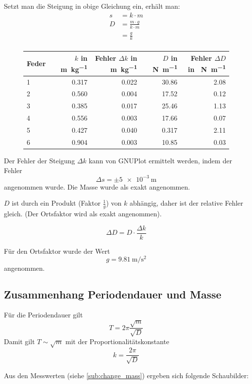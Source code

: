 Setzt man die Steigung in obige Gleichung ein, erhält man:
\begin{align*}
s &= k \cdot m \\
D &= \frac{m \cdot g}{k \cdot m} \\
  &= \frac{g}{k} \\
\end{align*}

\begin{figure}[H]
\centering
\begin{tabular}{lrrrr}
Feder & $k$ in \SI{}{\meter\per\kilo\gram} & Fehler $\Delta k$ in \SI{}{\meter\per\kilo\gram} & $D$ in \SI{}{\newton\per\meter} & Fehler $\Delta D$ in \SI{}{\newton\per\meter} \\ \hline
1 & \num{0.317} & \num{0.022} & \num{30.86} & \num{2.08}\\
2 & \num{0.560} & \num{0.004} & \num{17.52} & \num{0.12}\\
3 & \num{0.385} & \num{0.017} & \num{25.46} & \num{1.13}\\
4 & \num{0.556} & \num{0.003} & \num{17.66} & \num{0.07}\\
5 & \num{0.427} & \num{0.040} & \num{0.317} & \num{2.11}\\
6 & \num{0.904} & \num{0.003} & \num{10.85} & \num{0.03}\\
\end{tabular}
\end{figure}

Der Fehler der Steigung $\Delta k$ kann von GNUPlot ermittelt werden, indem der Fehler
$$\Delta s = \pm \SI{5e-3}{\meter}$$
angenommen wurde. Die Masse wurde als exakt angenommen.

$D$ ist durch ein Produkt (Faktor $\frac{1}{g}$) von $k$ abhängig, daher ist der relative Fehler gleich. (Der Ortsfaktor wird als exakt angenommen).

$$\Delta D = D \cdot \frac{\Delta k}{k}$$

Für den Ortsfaktor wurde der Wert
$$g = \SI{9.81}{\meter\per\square\second}$$
angenommen.

\subsection{Zusammenhang Periodendauer und Masse}
Für die Periodendauer gilt
$$T = 2\pi \frac{\sqrt{m}}{\sqrt{D}}$$
Damit gilt $T \sim \sqrt{m}$ mit der Proportionalitätskonstante
$$k = \frac{2\pi}{\sqrt{D}}$$

Aus den Messwerten (siehe \ref{sub:change_mass}) ergeben sich folgende Schaubilder:

